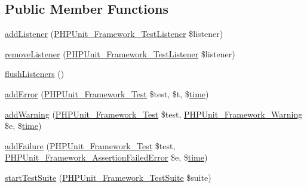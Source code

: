 \subsection*{Public Member Functions}
\begin{DoxyCompactItemize}
\item 
\mbox{\hyperlink{class_p_h_p_unit___framework___test_result_abce8321a6a5c1f5aade732aa1228dacc}{add\+Listener}} (\mbox{\hyperlink{interface_p_h_p_unit___framework___test_listener}{P\+H\+P\+Unit\+\_\+\+Framework\+\_\+\+Test\+Listener}} \$listener)
\item 
\mbox{\hyperlink{class_p_h_p_unit___framework___test_result_ae12e62b3cabb5ae13fbcaf68fb566fa3}{remove\+Listener}} (\mbox{\hyperlink{interface_p_h_p_unit___framework___test_listener}{P\+H\+P\+Unit\+\_\+\+Framework\+\_\+\+Test\+Listener}} \$listener)
\item 
\mbox{\hyperlink{class_p_h_p_unit___framework___test_result_a4c490d1a96555d52c00e801853915529}{flush\+Listeners}} ()
\item 
\mbox{\hyperlink{class_p_h_p_unit___framework___test_result_a1f7cfe458b4a0c0d5a38be8266a0a76e}{add\+Error}} (\mbox{\hyperlink{interface_p_h_p_unit___framework___test}{P\+H\+P\+Unit\+\_\+\+Framework\+\_\+\+Test}} \$test, \$t, \$\mbox{\hyperlink{class_p_h_p_unit___framework___test_result_ad0150b710cab9ab24923212cbf226447}{time}})
\item 
\mbox{\hyperlink{class_p_h_p_unit___framework___test_result_a6c3d134992c5b03573561ef82e7f743d}{add\+Warning}} (\mbox{\hyperlink{interface_p_h_p_unit___framework___test}{P\+H\+P\+Unit\+\_\+\+Framework\+\_\+\+Test}} \$test, \mbox{\hyperlink{class_p_h_p_unit___framework___warning}{P\+H\+P\+Unit\+\_\+\+Framework\+\_\+\+Warning}} \$e, \$\mbox{\hyperlink{class_p_h_p_unit___framework___test_result_ad0150b710cab9ab24923212cbf226447}{time}})
\item 
\mbox{\hyperlink{class_p_h_p_unit___framework___test_result_a668f17b68705c5c8686bac690a6f719d}{add\+Failure}} (\mbox{\hyperlink{interface_p_h_p_unit___framework___test}{P\+H\+P\+Unit\+\_\+\+Framework\+\_\+\+Test}} \$test, \mbox{\hyperlink{class_p_h_p_unit___framework___assertion_failed_error}{P\+H\+P\+Unit\+\_\+\+Framework\+\_\+\+Assertion\+Failed\+Error}} \$e, \$\mbox{\hyperlink{class_p_h_p_unit___framework___test_result_ad0150b710cab9ab24923212cbf226447}{time}})
\item 
\mbox{\hyperlink{class_p_h_p_unit___framework___test_result_a901a86a623d83184267b21f2daee0ff5}{start\+Test\+Suite}} (\mbox{\hyperlink{class_p_h_p_unit___framework___test_suite}{P\+H\+P\+Unit\+\_\+\+Framework\+\_\+\+Test\+Suite}} \$suite)

\end{DoxyCompactItemize}
